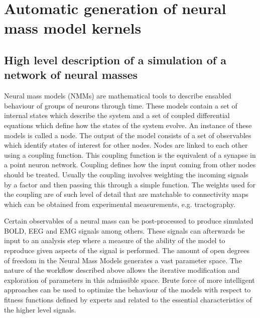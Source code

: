 \documentclass[a4paper,10pt]{article}
\title{}
\author{}
\begin{document}
\maketitle



\section{Automatic generation of neural mass model kernels}
\subsection{High level description of a simulation of a network of neural masses}
Neural mass models (NMMs) are mathematical tools to describe ensabled behaviour of groups of neurons through time. 
These models contain a set of internal states which describe the system and a set of coupled differential equations which define how the states of the system evolve.
An instance of these models is called a node.
The output of the model consists of a set of observables which identify states of interest for other nodes.
Nodes are linked to each other using a coupling function.
This coupling function is the equivalent of a synapse in a point neuron network.
Coupling defines how the input coming from other nodes should be treated.
Usually the coupling involves weighting the incoming signals by a factor and then passing this through a simple function.
The weights used for the coupling are of such level of detail that are matchable to connectivity maps which can be obtained from experimental measurements, e.g. tractography.

Certain observables of a neural mass can be post-processed to produce simulated BOLD, EEG and EMG signals among others. 
These signals can afterwards be input to an analysis step where a measure of the ability of the model to reproduce given aspects of the signal is performed.
The amount of open degrees of freedom in the Neural Mass Models generates a vast parameter space. 
The nature of the workflow described above allows the iterative modification and exploration of parameters in this admissible space.
Brute force of more intelligent approaches can be used to optimize the behaviour of the models with respect to fitness functions defined by experts and related to the essential characteristics of the higher level signals.
\end{document}
